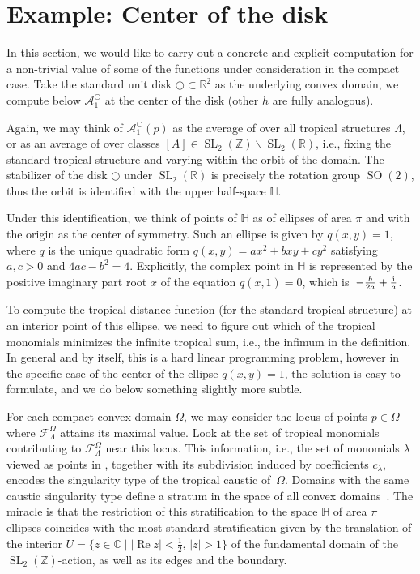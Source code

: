 \documentclass[10pt,a4paper]{amsart}
\numberwithin{equation}{section}
\theoremstyle{definition}
\newcommand\ZZ{\mathbb Z}
\newcommand\SL{\operatorname{SL}}
\begin{document}
\section{Example: Center of the disk}\label{sec:example}
In this section, we would like to carry out a concrete and explicit computation for a non-trivial value of some of the functions under consideration in the compact case. Take the standard unit disk $\bigcirc\subset\mathbb{R}^2$ as the underlying convex domain, we compute below $\mathcal{A}_1^\bigcirc$ at the center of the disk (other $h$ are fully analogous).

Again, we may think of $\mathcal{A}_1^{\bigcirc}(p)$ as the average of  over all tropical structures $\Lambda$, or as an average of  over classes $[A]\in\SL_2(\mathbb{Z})\backslash\SL_2(\mathbb{R})$, i.e., fixing the standard tropical structure and varying within the orbit of the domain. The stabilizer of the disk $\bigcirc$ under $\SL_2(\mathbb{R})$ is precisely the rotation group $\operatorname{SO}(2)$, thus the orbit is identified with the upper half-space $\mathbb{H}$.

Under this identification, we think of points of $\mathbb{H}$ as of ellipses of area $\pi$ and with the origin as the center of symmetry. Such an ellipse is given by $q(x,y)=1$, where $q$ is the unique quadratic form $q(x,y)=ax^2+bxy+cy^2$ satisfying $a,c>0$ and $4ac-b^2=4$. Explicitly, the complex point in $\mathbb{H}$ is represented by the positive imaginary part root $x$ of the equation $q(x,1)=0$, which is~${-\frac{b}{2a}+\frac{{\rm i}}{a}}$.

To compute the tropical distance function (for the standard tropical structure) at an interior point of this ellipse, we need to figure out which of the tropical monomials minimizes the infinite tropical sum, i.e., the infimum in the definition. In general and by itself, this is a hard linear programming problem, however in the specific case of the center of the ellipse $q(x,y)=1$, the solution is easy to formulate, and we do below something slightly more subtle.

For each compact convex domain $\Omega$, we may consider the locus of points $p\in\Omega$ where $\mathcal{F}_\Lambda^\Omega$ attains its maximal value. Look at the set of tropical monomials contributing to $\mathcal{F}_\Lambda^\Omega$ near this locus. This information, i.e., the set of monomials $\lambda$ viewed as points in \smash{$\bigl(\ZZ^2\bigr)^*$}, together with its subdivision induced by coefficients $c_\lambda$, encodes the singularity type of the tropical caustic of~$\Omega$. Domains with the same caustic singularity type define a stratum in the space of all convex domains~\cite{thesism}. The miracle is that the restriction of this stratification to the space $\mathbb{H}$ of area $\pi$ ellipses coincides with the most standard stratification given by the translation of the interior $U=\bigl\{z\in\mathbb{C}\mid |{\operatorname{Re} z}|<\frac{1}{2},\, |z|>1\bigr\}$ of the fundamental domain of the $\SL_2(\mathbb{Z})$-action, as well as its edges and the boundary.
\end{document}
